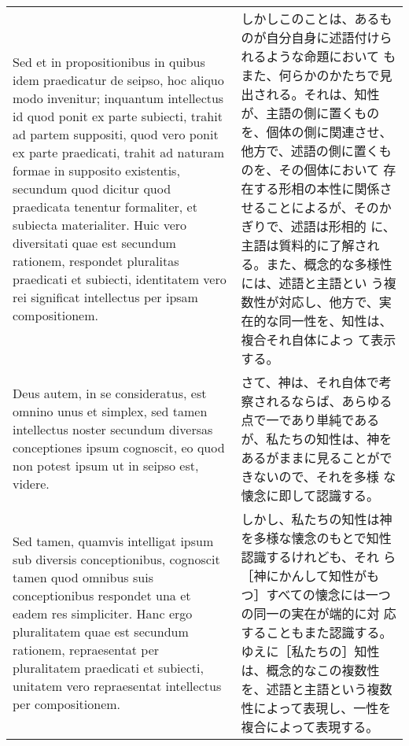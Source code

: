 \documentclass[paper=a4paper,fontsize=10pt,jafontsize=9pt,titlepage]{jlreq}
\begin{document}
\begin{longtable}{p{21em}p{21em}}
\\

Sed et in propositionibus in quibus idem praedicatur de seipso, hoc
aliquo modo invenitur; inquantum intellectus id quod ponit ex parte
subiecti, trahit ad partem suppositi, quod vero ponit ex parte
praedicati, trahit ad naturam formae in supposito existentis, secundum
quod dicitur quod praedicata tenentur formaliter, et subiecta
materialiter. Huic vero diversitati quae est secundum rationem,
respondet pluralitas praedicati et subiecti, identitatem vero rei
significat intellectus per ipsam compositionem.

&

しかしこのことは、あるものが自分自身に述語付けられるような命題において
もまた、何らかのかたちで見出される。それは、知性が、主語の側に置くもの
を、個体の側に関連させ、他方で、述語の側に置くものを、その個体において
存在する形相の本性に関係させることによるが、そのかぎりで、述語は形相的
に、主語は質料的に了解される。また、概念的な多様性には、述語と主語とい
う複数性が対応し、他方で、実在的な同一性を、知性は、複合それ自体によっ
て表示する。

\\

Deus autem, in se consideratus, est omnino unus et simplex, sed tamen
intellectus noster secundum diversas conceptiones ipsum cognoscit, eo
quod non potest ipsum ut in seipso est, videre.

&

さて、神は、それ自体で考察されるならば、あらゆる点で一であり単純である
が、私たちの知性は、神をあるがままに見ることができないので、それを多様
な懐念に即して認識する。

\\

Sed tamen, quamvis intelligat ipsum sub diversis conceptionibus,
cognoscit tamen quod omnibus suis conceptionibus respondet una et
eadem res simpliciter. Hanc ergo pluralitatem quae est secundum
rationem, repraesentat per pluralitatem praedicati et subiecti,
unitatem vero repraesentat intellectus per compositionem.

&

しかし、私たちの知性は神を多様な懐念のもとで知性認識するけれども、それ
ら［神にかんして知性がもつ］すべての懐念には一つの同一の実在が端的に対
応することもまた認識する。ゆえに［私たちの］知性は、概念的なこの複数性
を、述語と主語という複数性によって表現し、一性を複合によって表現する。

\\


\end{longtable}
\end{document}
